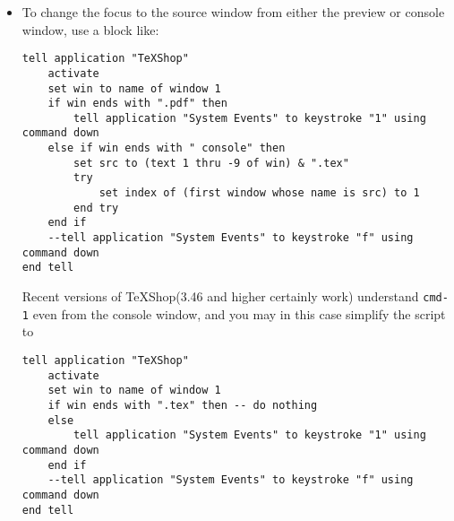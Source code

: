 \documentclass[11pt]{amsart}
\def\TeXShop{\TeX Shop\xspace}
\begin{document}
\begin{itemize}
Under normal circumstances, both controls can be used in a preview or console window and will take you to some (not necessarily the corresponding) source window. Circumstances appear not to be normal if you have open a {\tt.pdf} with no corresponding {\tt.tex} file. In this case, both commands may fail from a console window, and are not guaranteed to work from a preview window, though usually, one of them does. Scripting these commands requires use of {\tt key code} rather than {\tt keystroke}. (Try googling for {\tt applescript key code} for a list of all such codes.)
\begin{verbatim}
tell application "TeXShop"
    tell application "System Events" to key code 120 using command down
end tell
\end{verbatim}
\item To change the focus to the source window from either the preview or console window, use a block like:
\begin{verbatim}
tell application "TeXShop"
    activate
    set win to name of window 1
    if win ends with ".pdf" then
        tell application "System Events" to keystroke "1" using command down
    else if win ends with " console" then
        set src to (text 1 thru -9 of win) & ".tex"
        try
            set index of (first window whose name is src) to 1
        end try
    end if
    --tell application "System Events" to keystroke "f" using command down
end tell
\end{verbatim}
Recent versions of \TeXShop (3.46 and higher certainly work) understand {\tt cmd-1} even from the console window, and you may in this case simplify the script to
\begin{verbatim}
tell application "TeXShop"
    activate
    set win to name of window 1
    if win ends with ".tex" then -- do nothing
    else
        tell application "System Events" to keystroke "1" using command down
    end if
    --tell application "System Events" to keystroke "f" using command down
end tell
\end{verbatim}

\end{itemize}
\end{document}
